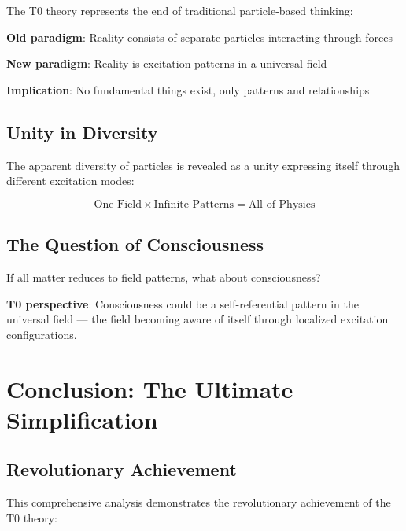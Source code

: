 	The T0 theory represents the end of traditional particle-based thinking:
	
	\begin{tcolorbox}[colback=purple!5!white,colframe=purple!75!black,title=Paradigm Shift: From Particles to Patterns]
		\textbf{Old paradigm}: Reality consists of separate particles interacting through forces
		
		\textbf{New paradigm}: Reality is excitation patterns in a universal field
		
		\textbf{Implication}: No fundamental things exist, only patterns and relationships
	\end{tcolorbox}
	
	\subsection{Unity in Diversity}
	
	The apparent diversity of particles is revealed as a unity expressing itself through different excitation modes:
	
	\begin{equation}
		\boxed{\text{One Field} \times \text{Infinite Patterns} = \text{All of Physics}}
		\label{eq:ultimate_unity}
	\end{equation}
	
	\subsection{The Question of Consciousness}
	
	If all matter reduces to field patterns, what about consciousness?
	
	\textbf{T0 perspective}: Consciousness could be a self-referential pattern in the universal field --- the field becoming aware of itself through localized excitation configurations.
	
	\section{Conclusion: The Ultimate Simplification}
	
	\subsection{Revolutionary Achievement}
	
	This comprehensive analysis demonstrates the revolutionary achievement of the T0 theory:
	
